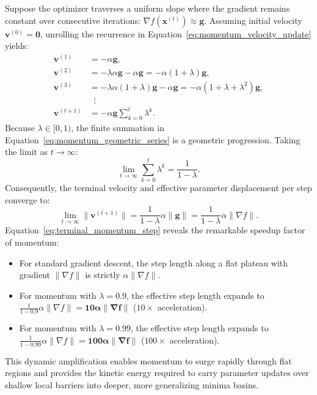 Suppose the optimizer traverses a uniform slope where the gradient remains constant over consecutive iterations: $\nabla f(\mathbf{x}^{(t)}) \approx \mathbf{g}$. Assuming initial velocity $\mathbf{v}^{(0)} = \mathbf{0}$, unrolling the recurrence in Equation~\eqref{eq:momentum_velocity_update} yields:
\begin{align}
\mathbf{v}^{(1)} &= -\alpha \mathbf{g}, \nonumber \\
\mathbf{v}^{(2)} &= -\lambda \alpha \mathbf{g} - \alpha \mathbf{g} = -\alpha (1 + \lambda) \mathbf{g}, \nonumber \\
\mathbf{v}^{(3)} &= -\lambda \alpha (1 + \lambda) \mathbf{g} - \alpha \mathbf{g} = -\alpha (1 + \lambda + \lambda^2) \mathbf{g}, \nonumber \\
&\;\;\vdots \nonumber \\
\mathbf{v}^{(t+1)} &= -\alpha \mathbf{g} \sum_{k=0}^t \lambda^k.
\label{eq:momentum_geometric_series}
\end{align}
Because $\lambda \in [0, 1)$, the finite summation in Equation~\eqref{eq:momentum_geometric_series} is a geometric progression. Taking the limit as $t \to \infty$:
\begin{equation}
\lim_{t \to \infty} \sum_{k=0}^t \lambda^k = \frac{1}{1 - \lambda}.
\end{equation}
Consequently, the terminal velocity and effective parameter displacement per step converge to:
\begin{equation}
\lim_{t \to \infty} \|\mathbf{v}^{(t+1)}\| = \frac{1}{1 - \lambda} \alpha \|\mathbf{g}\| = \frac{1}{1 - \lambda} \alpha \|\nabla f\|.
\label{eq:terminal_momentum_step}
\end{equation}
Equation~\eqref{eq:terminal_momentum_step} reveals the remarkable speedup factor of momentum:
\begin{itemize}[noitemsep]
  \item For standard gradient descent, the step length along a flat plateau with gradient $\|\nabla f\|$ is strictly $\alpha \|\nabla f\|$.
  \item For momentum with $\lambda = 0.9$, the effective step length expands to $\frac{1}{1 - 0.9}\alpha \|\nabla f\| = \mathbf{10 \alpha \|\nabla f\|}$ ($10\times$ acceleration).
  \item For momentum with $\lambda = 0.99$, the effective step length expands to $\frac{1}{1 - 0.99}\alpha \|\nabla f\| = \mathbf{100 \alpha \|\nabla f\|}$ ($100\times$ acceleration).
\end{itemize}
This dynamic amplification enables momentum to surge rapidly through flat regions and provides the kinetic energy required to carry parameter updates over shallow local barriers into deeper, more generalizing minima basins.

